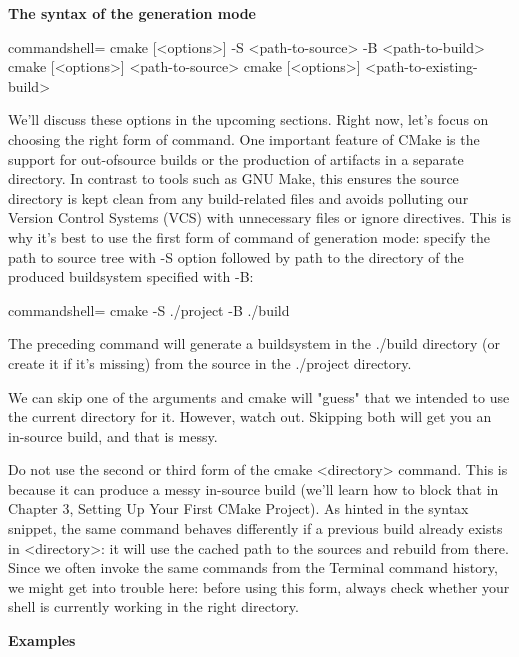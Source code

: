 \textbf{The syntax of the generation mode}

\begin{tcblisting}{commandshell={}}
cmake [<options>] -S <path-to-source> -B <path-to-build>
cmake [<options>] <path-to-source>
cmake [<options>] <path-to-existing-build>
\end{tcblisting}

We'll discuss these options in the upcoming sections. Right now, let's focus on choosing the right form of command. One important feature of CMake is the support for out-ofsource builds or the production of artifacts in a separate directory. In contrast to tools such as GNU Make, this ensures the source directory is kept clean from any build-related files and avoids polluting our Version Control Systems (VCS) with unnecessary files or ignore directives. This is why it's best to use the first form of command of generation mode: specify the path to source tree with -S option followed by path to the directory of the produced buildsystem specified with -B:

\begin{tcblisting}{commandshell={}}
cmake -S ./project -B ./build
\end{tcblisting}

The preceding command will generate a buildsystem in the ./build directory (or create it if it's missing) from the source in the ./project directory.

We can skip one of the arguments and cmake will "guess" that we intended to use the current directory for it. However, watch out. Skipping both will get you an in-source build, and that is messy.

\begin{tcolorbox}[colback=blue!5!white,colframe=blue!75!black,title=Not Recommended]
Do not use the second or third form of the cmake <directory> command. This is because it can produce a messy in-source build (we'll learn how to block that in Chapter 3, Setting Up Your First CMake Project). As hinted in the syntax snippet, the same command behaves differently if a previous build already exists in <directory>: it will use the cached path to the sources and rebuild from there. Since we often invoke the same commands from the Terminal command history, we might get into trouble here: before using this form, always check whether your shell is currently working in the right directory.
\end{tcolorbox}

\textbf{Examples}


